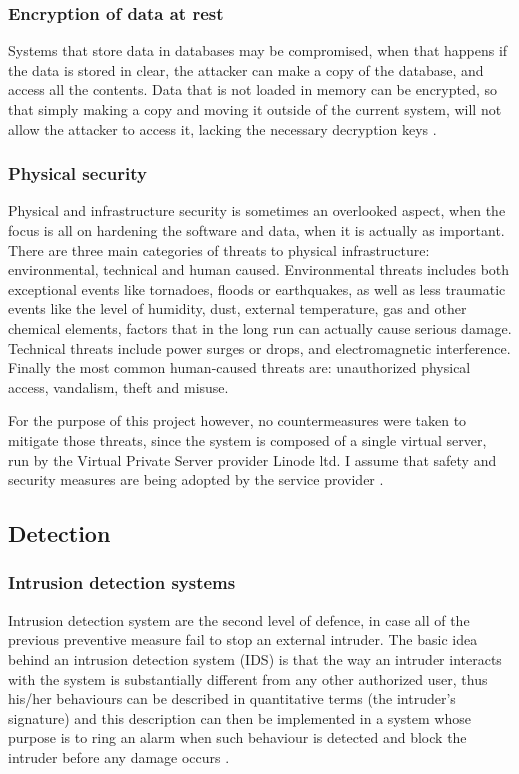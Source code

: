 \subsubsection{Encryption of data at rest}
Systems that store data in databases may be compromised, when that happens if
the data is stored in clear, the attacker can make a copy of the database, and
access all the contents. Data that is not loaded in memory can be encrypted, so
that simply making a copy and moving it outside of the current system, will not
allow the attacker to access it, lacking the necessary decryption keys
\cite{WS15}.

\subsubsection{Physical security}
Physical and infrastructure security is sometimes an overlooked aspect, when the
focus is all on hardening the software and data, when it is actually as
important. There are three main categories of threats to physical
infrastructure: environmental, technical and human caused. Environmental threats
includes both exceptional events like tornadoes, floods or earthquakes, as well
as less traumatic events like the level of humidity, dust, external temperature, gas
and other chemical elements, factors that in the long run can actually cause
serious damage. Technical threats include power surges or drops, and
electromagnetic interference. Finally the most common human-caused threats are:
unauthorized physical access, vandalism, theft and misuse.

For the purpose of this project however, no countermeasures were taken to
mitigate those threats, since the system is composed of a single virtual server,
run by the Virtual Private Server provider Linode ltd. I assume that safety and
security measures are being adopted by the service provider \cite{WS15}.

\subsection{Detection}

\subsubsection{Intrusion detection systems}
Intrusion detection system are the second level of defence, in case all
of the previous preventive measure fail to stop an external intruder. The basic
idea behind an intrusion detection system (IDS) is that the way an intruder
interacts with the system is substantially different from any other authorized
user, thus his/her behaviours can be described in quantitative terms (the
intruder's signature) and this description can then be implemented in a system
whose purpose is to ring an alarm when such behaviour is detected and block the
intruder before any damage occurs \cite{WS15}.

